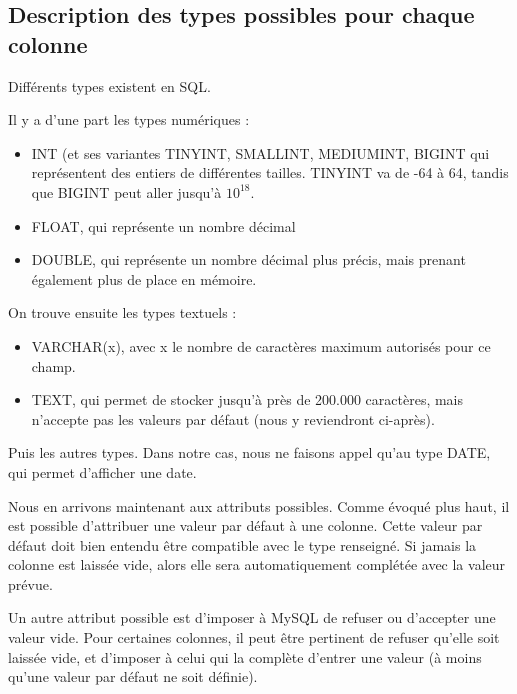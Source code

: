 \documentclass[12pt,a4paper]{article}
\begin{document}
    \subsection{Description des types possibles pour chaque colonne}\label{types}
        Différents types existent en SQL.
        
        Il y a d'une part les types numériques :
        \begin{itemize}
            \item INT (et ses variantes TINYINT, SMALLINT, MEDIUMINT, BIGINT qui représentent
            des entiers de différentes tailles. TINYINT va de -64 à 64, 
            tandis que BIGINT peut aller jusqu'à $10^{18}$.
            \item FLOAT, qui représente un nombre décimal 
            \item DOUBLE, qui représente un nombre décimal plus précis,
            mais prenant également plus de place en mémoire.
        \end{itemize}

        On trouve ensuite les types textuels :
        \begin{itemize}
            \item VARCHAR(x), avec x le nombre de caractères maximum autorisés
            pour ce champ.
            \item TEXT, qui permet de stocker jusqu'à près de 200.000 caractères,
            mais n'accepte pas les valeurs par défaut (nous y reviendront ci-après).
        \end{itemize}

        Puis les autres types. Dans notre cas, nous ne faisons appel
        qu'au type DATE, qui permet d'afficher une date.

        Nous en arrivons maintenant aux attributs possibles.
        Comme évoqué plus haut, il est possible d'attribuer une valeur
        par défaut à une colonne. Cette valeur par défaut doit bien entendu
        être compatible avec le type renseigné. Si jamais la colonne est laissée
        vide, alors elle sera automatiquement complétée avec la valeur prévue.

        Un autre attribut possible est d'imposer à MySQL de refuser ou
        d'accepter une valeur vide. Pour certaines colonnes, il peut être
        pertinent de refuser qu'elle soit laissée vide, et d'imposer à celui
        qui la complète d'entrer une valeur (à moins qu'une valeur par défaut
        ne soit définie).
\end{document}
